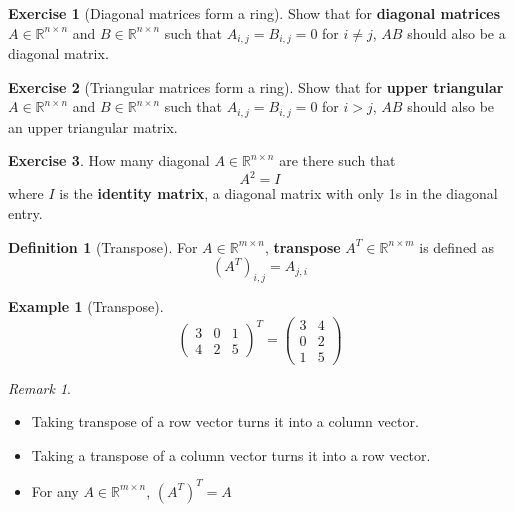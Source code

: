 \documentclass[12pt, a4paper]{article}
\newcommand{\R}{\mathbb{R}}
\theoremstyle{remark}
\newtheorem{remark}{Remark}
\theoremstyle{definition}
\newtheorem{definition}{Definition}
\newtheorem{example}{Example}
\newtheorem{exercise}{Exercise}
\numberwithin{equation}{section}
\numberwithin{definition}{section}
\numberwithin{example}{section}
\numberwithin{exercise}{section}
\numberwithin{remark}{section}
\numberwithin{figure}{section}
\begin{document}
\begin{exercise}[Diagonal matrices form a ring]
    Show that for \textbf{diagonal matrices} $A \in \R^{n \times n}$ and $B \in \R^{n \times n}$ such that $A_{i,j} = B_{i,j} = 0$ for $i \neq j$, $AB$ should also be a diagonal matrix.
\end{exercise}
\begin{exercise}[Triangular matrices form a ring]
    Show that for \textbf{upper triangular} $A \in \R^{n \times n}$ and $B \in \R^{n \times n}$ such that $A_{i,j} = B_{i,j} = 0$ for $i > j$, $AB$ should also be an upper triangular matrix.
\end{exercise}
\begin{exercise}
    How many diagonal $A \in \R^{n \times n}$ are there such that
    \begin{equation*}
        A^2 = I
    \end{equation*}
    where $I$ is the \textbf{identity matrix}, a diagonal matrix with only 1s in the diagonal entry.
\end{exercise}
\begin{definition}[Transpose]
    For $A \in \R^{m \times n}$, \textbf{transpose} $A^T \in \R^{n \times m}$ is defined as
    \begin{equation*}
        \left( A^T \right)_{i,j} = A_{j,i}
    \end{equation*}
\end{definition}
\begin{example}[Transpose]
    \begin{equation*}
        \begin{pmatrix}
            3 & 0 & 1 \\
            4 & 2 & 5
        \end{pmatrix}^T
        =
        \begin{pmatrix}
            3 & 4 \\
            0 & 2 \\
            1 & 5
        \end{pmatrix}
    \end{equation*}
\end{example}
\begin{remark}
    \begin{itemize}
            \item Taking transpose of a row vector turns it into a column vector.
            \item Taking a transpose of a column vector turns it into a row vector.
            \item For any $A \in \R^{m \times n}$, $\left( A^T \right)^T = A$
    \end{itemize}
\end{remark}
\end{document}
